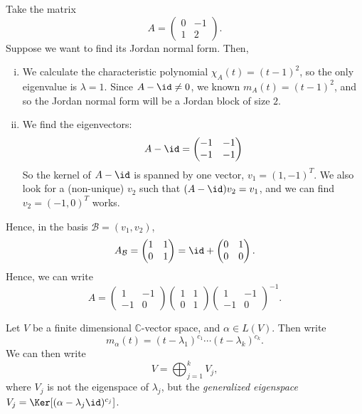 \documentclass[12pt]{article}
\begin{document}
\begin{exbox}
	Take the matrix
	\[
	A =
	\begin{pmatrix}
		0 & -1 \\
		1 & 2
	\end{pmatrix}
	.\]
	Suppose we want to find its Jordan normal form. Then,
	\begin{enumerate}[(i)]
		\item We calculate the characteristic polynomial $\chi_{A}(t) = (t - 1)^2$, so the only eigenvalue is $\lambda = 1$. Since $A - \id \neq 0$, we known $m_{A}(t) = (t - 1)^2$, and so the Jordan normal form will be a Jordan block of size $2$.
		\item We find the eigenvectors:
			\[
			A - \id =
			\begin{pmatrix}
				-1 & -1 \\
				-1 & -1
			\end{pmatrix}
			\]
			So the kernel of $A - \id$ is spanned by one vector, $v_1 = (1, -1)^{T}$. We also look for a (non-unique) $v_2$ such that $(A - \id)v_2 = v_1$, and we can find $v_2 = (-1, 0)^{T}$ works.
	\end{enumerate}
	Hence, in the basis $\mathcal{B} = (v_1, v_2)$,
	\[
	A_{\mathcal{B}} =
	\begin{pmatrix}
		1 & 1 \\
		0 & 1
	\end{pmatrix}
	= \id +
	\begin{pmatrix}
		0 & 1 \\ 
		0 & 0
	\end{pmatrix}
	.\]
	Hence, we can write
	\[
	A =
	\begin{pmatrix}
		1 & -1 \\
		-1 & 0
	\end{pmatrix}
	\begin{pmatrix}
		1 & 1 \\
		0 & 1
	\end{pmatrix}
	\begin{pmatrix}
		1 & -1 \\
		-1 & 0
	\end{pmatrix}^{-1}
	.\]
\end{exbox}

\begin{theorem}
	Let $V$ be a finite dimensional $\mathbb{C}$-vector space, and $\alpha \in L(V)$. Then write
	\[
		m_{\alpha}(t) = (t - \lambda_1)^{c_1} \cdots (t - \lambda_k)^{c_k}
	.\]
	We can then write
	\[
	V = \bigoplus_{j = 1}^{k}V_j
	,\]
	where $V_j$ is not the eigenspace of $\lambda_j$, but the \textit{generalized eigenspace} $V_j = \Ker[(\alpha - \lambda_j \id)^{c_j}]$.
\end{theorem}
\end{document}

